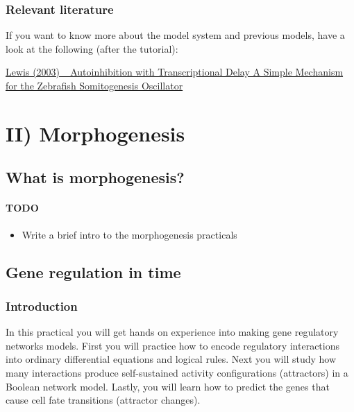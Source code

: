 \documentclass[
  letterpaper,
  DIV=11,
  numbers=noendperiod]{scrreprt}
\providecommand{\tightlist}{%
  \setlength{\itemsep}{0pt}\setlength{\parskip}{0pt}}\usepackage{longtable,booktabs,array}
\theoremstyle{definition}
\theoremstyle{remark}
\begin{document}
\section{Relevant literature}\label{relevant-literature}

If you want to know more about the model system and previous models,
have a look at the following (after the tutorial):

\href{https://doi.org/10.1016/S0960-9822(03)00534-7}{Lewis (2003)
\_Autoinhibition with Transcriptional Delay A Simple Mechanism for the
Zebrafish Somitogenesis Oscillator}

\part{II) Morphogenesis}

\chapter{What is morphogenesis?}\label{what-is-morphogenesis}

\subsection{TODO}\label{todo-1}

\begin{itemize}
\tightlist
\item
  Write a brief intro to the morphogenesis practicals
\end{itemize}

\chapter{Gene regulation in time}\label{gene-regulation-in-time}

\section{Introduction}\label{introduction-1}

In this practical you will get hands on experience into making gene
regulatory networks models. First you will practice how to encode
regulatory interactions into ordinary differential equations and logical
rules. Next you will study how many interactions produce self-sustained
activity configurations (attractors) in a Boolean network model. Lastly,
you will learn how to predict the genes that cause cell fate transitions
(attractor changes).
\end{document}
